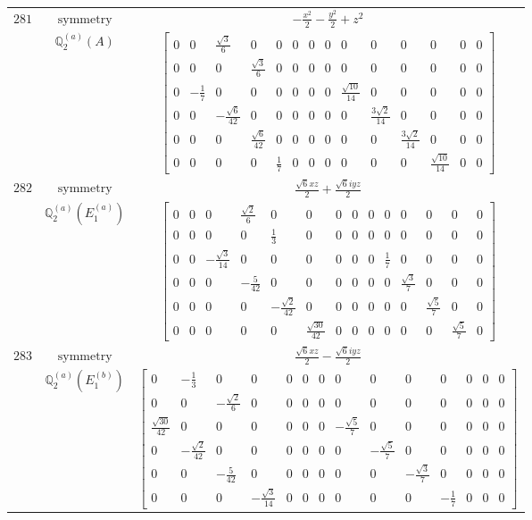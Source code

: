\documentclass[fleqn,8pt,landscape]{jsarticle}
\begin{document}
\begin{longtable}{ccc}
$ 281 $ & $ \text{symmetry} $ & $ - \frac{x^{2}}{2} - \frac{y^{2}}{2} + z^{2} $ \\
$  $ & $ \mathbb{Q}_{2}^{(a)}(A) $ & $ \begin{bmatrix} 0 & 0 & \frac{\sqrt{3}}{6} & 0 & 0 & 0 & 0 & 0 & 0 & 0 & 0 & 0 & 0 & 0 \\ 0 & 0 & 0 & \frac{\sqrt{3}}{6} & 0 & 0 & 0 & 0 & 0 & 0 & 0 & 0 & 0 & 0 \\ 0 & - \frac{1}{7} & 0 & 0 & 0 & 0 & 0 & 0 & \frac{\sqrt{10}}{14} & 0 & 0 & 0 & 0 & 0 \\ 0 & 0 & - \frac{\sqrt{6}}{42} & 0 & 0 & 0 & 0 & 0 & 0 & \frac{3 \sqrt{2}}{14} & 0 & 0 & 0 & 0 \\ 0 & 0 & 0 & \frac{\sqrt{6}}{42} & 0 & 0 & 0 & 0 & 0 & 0 & \frac{3 \sqrt{2}}{14} & 0 & 0 & 0 \\ 0 & 0 & 0 & 0 & \frac{1}{7} & 0 & 0 & 0 & 0 & 0 & 0 & \frac{\sqrt{10}}{14} & 0 & 0 \end{bmatrix} $ \\ \hline
$ 282 $ & $ \text{symmetry} $ & $ \frac{\sqrt{6} x z}{2} + \frac{\sqrt{6} i y z}{2} $ \\
$  $ & $ \mathbb{Q}_{2}^{(a)}(E_{1}^{(a)}) $ & $ \begin{bmatrix} 0 & 0 & 0 & \frac{\sqrt{2}}{6} & 0 & 0 & 0 & 0 & 0 & 0 & 0 & 0 & 0 & 0 \\ 0 & 0 & 0 & 0 & \frac{1}{3} & 0 & 0 & 0 & 0 & 0 & 0 & 0 & 0 & 0 \\ 0 & 0 & - \frac{\sqrt{3}}{14} & 0 & 0 & 0 & 0 & 0 & 0 & \frac{1}{7} & 0 & 0 & 0 & 0 \\ 0 & 0 & 0 & - \frac{5}{42} & 0 & 0 & 0 & 0 & 0 & 0 & \frac{\sqrt{3}}{7} & 0 & 0 & 0 \\ 0 & 0 & 0 & 0 & - \frac{\sqrt{2}}{42} & 0 & 0 & 0 & 0 & 0 & 0 & \frac{\sqrt{5}}{7} & 0 & 0 \\ 0 & 0 & 0 & 0 & 0 & \frac{\sqrt{30}}{42} & 0 & 0 & 0 & 0 & 0 & 0 & \frac{\sqrt{5}}{7} & 0 \end{bmatrix} $ \\ \hline
$ 283 $ & $ \text{symmetry} $ & $ \frac{\sqrt{6} x z}{2} - \frac{\sqrt{6} i y z}{2} $ \\
$  $ & $ \mathbb{Q}_{2}^{(a)}(E_{1}^{(b)}) $ & $ \begin{bmatrix} 0 & - \frac{1}{3} & 0 & 0 & 0 & 0 & 0 & 0 & 0 & 0 & 0 & 0 & 0 & 0 \\ 0 & 0 & - \frac{\sqrt{2}}{6} & 0 & 0 & 0 & 0 & 0 & 0 & 0 & 0 & 0 & 0 & 0 \\ \frac{\sqrt{30}}{42} & 0 & 0 & 0 & 0 & 0 & 0 & - \frac{\sqrt{5}}{7} & 0 & 0 & 0 & 0 & 0 & 0 \\ 0 & - \frac{\sqrt{2}}{42} & 0 & 0 & 0 & 0 & 0 & 0 & - \frac{\sqrt{5}}{7} & 0 & 0 & 0 & 0 & 0 \\ 0 & 0 & - \frac{5}{42} & 0 & 0 & 0 & 0 & 0 & 0 & - \frac{\sqrt{3}}{7} & 0 & 0 & 0 & 0 \\ 0 & 0 & 0 & - \frac{\sqrt{3}}{14} & 0 & 0 & 0 & 0 & 0 & 0 & - \frac{1}{7} & 0 & 0 & 0 \end{bmatrix} $ \\ \hline

\end{longtable}
\end{document}

